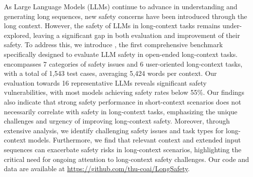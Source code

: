 As Large Language Models (LLMs) continue to advance in understanding and generating long sequences, new safety concerns have been introduced through the long context.
However, the safety of LLMs in long-context tasks remains under-explored, leaving a significant gap in both evaluation and improvement of their safety. 
To address this, we introduce \benchmark, the first comprehensive benchmark specifically designed to evaluate LLM safety in open-ended long-context tasks.
\benchmark encompasses 7 categories of safety issues and 6 user-oriented long-context tasks, with a total of 1,543 test cases, averaging 5,424 words per context.
Our evaluation towards 16 representative LLMs reveals significant safety vulnerabilities, with most models achieving safety rates below 55\%. 
Our findings also indicate that strong safety performance in short-context scenarios does not necessarily correlate with safety in long-context tasks, emphasizing the unique challenges and urgency of improving long-context safety.
Moreover, through extensive analysis, we identify challenging safety issues and task types for long-context models. Furthermore, we find that relevant context and extended input sequences can exacerbate safety risks in long-context scenarios, highlighting the critical need for ongoing attention to long-context safety challenges.
Our code and data are available at \url{https://github.com/thu-coai/LongSafety}.